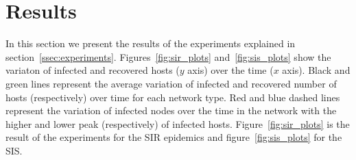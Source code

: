 \section{Results}

In this section we present the results of the experiments explained in section~\ref{ssec:experiments}. Figures~\ref{fig:sir_plots} and~\ref{fig:sis_plots} show the variaton of infected and recovered hosts ($y$ axis) over the time ($x$ axis). Black and green lines represent the average variation of infected and recovered number of hosts (respectively) over time for each network type. Red and blue dashed lines represent the variation of infected nodes over the time in the network with the higher and lower peak (respectively) of infected hosts. Figure~\ref{fig:sir_plots} is the result of the experiments for the SIR epidemics and figure~\ref{fig:sis_plots} for the SIS.

